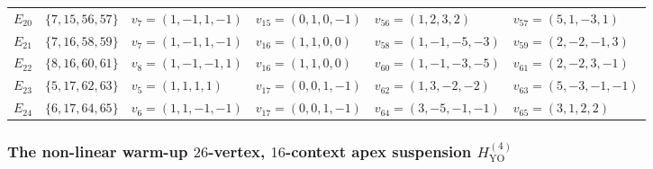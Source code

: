 \documentclass[aps,pra,reprint,superscriptaddress,longbibliography,nofootinbib,floatfix,10pt]{revtex4-2}
\theoremstyle{definition}
\newcommand{\YO}{\mathrm{YO}}
\begin{document}
\begin{longtable}{llllll}
$E_{20}$ & $\{7,15,56,57\}$ & $v_7=(1,-1,1,-1)$  & $v_{15}=(0,1,0,-1)$ & $v_{56}=(1,2,3,2)$    & $v_{57}=(5,1,-3,1)$ \\*
$E_{21}$ & $\{7,16,58,59\}$ & $v_7=(1,-1,1,-1)$  & $v_{16}=(1,1,0,0)$  & $v_{58}=(1,-1,-5,-3)$ & $v_{59}=(2,-2,-1,3)$ \\*
$E_{22}$ & $\{8,16,60,61\}$ & $v_8=(1,-1,-1,1)$  & $v_{16}=(1,1,0,0)$  & $v_{60}=(1,-1,-3,-5)$ & $v_{61}=(2,-2,3,-1)$ \\*
$E_{23}$ & $\{5,17,62,63\}$ & $v_5=(1,1,1,1)$    & $v_{17}=(0,0,1,-1)$ & $v_{62}=(1,3,-2,-2)$  & $v_{63}=(5,-3,-1,-1)$ \\*
$E_{24}$ & $\{6,17,64,65\}$ & $v_6=(1,1,-1,-1)$  & $v_{17}=(0,0,1,-1)$ & $v_{64}=(3,-5,-1,-1)$ & $v_{65}=(3,1,2,2)$
\end{longtable}
\endgroup

\subsubsection{The non-linear warm-up \texorpdfstring{$26$}{26}-vertex, \texorpdfstring{$16$}{16}-context apex suspension \texorpdfstring{$H_{\YO}^{(4)}$}{HYO(4)}}\label{d:app:hyo4}
\end{document}
